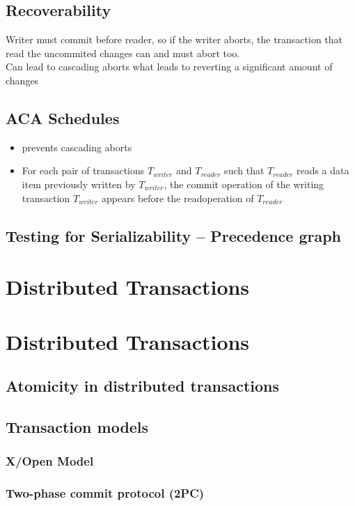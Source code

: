 		\subsection{Recoverability}
			Writer must commit before reader, so if the writer aborts, the transaction that read the uncommited changes can and must abort too.\\
			Can lead to cascading aborts what leads to reverting a significant amount of changes
		\subsection{ACA Schedules}
			\begin{itemize}
				\item prevents cascading aborts
				\item For each pair of transactions $ T_{writer} $ and $ T_{reader} $ such that $ T_{reader} $ reads a data item previously written by $ T_{writer} $, the commit operation of the writing  transaction $ T_{writer} $ appears before the readoperation of $ T_{reader} $ 
			\end{itemize}
		\subsection{Testing for Serializability -- Precedence graph}
		
		\section{Distributed Transactions}
		
		
	\section{Distributed Transactions}
	
		\subsection{Atomicity in distributed transactions}
		
		\subsection{Transaction models}
			\subsubsection{X/Open Model}
			
			\subsubsection{Two-phase commit protocol (2PC)}
			

